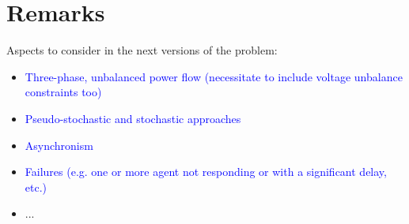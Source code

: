 \newpage
\section{Remarks}

Aspects to consider in the next versions of the problem:

\begin{itemize}
    \item \textcolor{blue}{Three-phase, unbalanced power flow (necessitate to include voltage unbalance constraints too)}
    \item \textcolor{blue}{Pseudo-stochastic and stochastic approaches}
    \item \textcolor{blue}{Asynchronism}
    \item \textcolor{blue}{Failures (e.g. one or more agent not responding or with a significant delay, etc.)}
    \item ...
\end{itemize}
    

